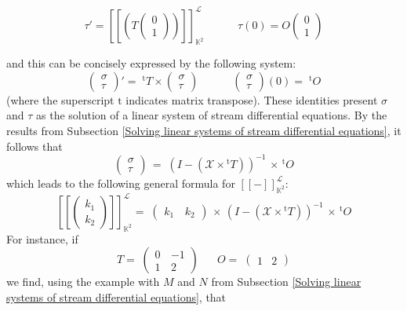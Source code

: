 \documentclass[3p]{elsarticle}
\newcommand{\X}{\mathcal{X}}           %
\newcommand{\fL}{\mathcal{L}}    %
\newcommand{\streamproduct}{\times} %
\newcommand{\beh}[3]{\left[\!\left[ #1 \right]\!\right]^{#2}_{#3}} %
\newcommand{\transp}{{}^{\mathrm{t}}}  %
\newcommand{\K}{\mathbb{K}}            %
\begin{document}
\[
\tau'=\beh{(T
%
\left(%
\begin{array}{c}
  0 \\
  1
\end{array}\right))}{\fL}{\K^2}
%
\;\;\;\;\;\;\;\;\;\;\; \tau(0)=O \left(%
\begin{array}{c}
  0 \\
  1
\end{array}\right)
\]

and this can be concisely expressed by the following system:
\[
\begin{pmatrix}
\sigma \\ \tau
\end{pmatrix} '
= \; \transp{T} \streamproduct
\begin{pmatrix}
\sigma \\ \tau
\end{pmatrix}
\;\;\;\;\;\;\;\;\;\;\;
\begin{pmatrix}
\sigma \\ \tau
\end{pmatrix} (0)
= \; \transp{O}
\]
(where the superscript $\mathrm{t}$ indicates matrix transpose). These
identities present $\sigma$ and $\tau$ as the solution of a linear
system of stream differential equations. By the results from
Subsection \ref{Solving linear systems of stream differential
equations}, it follows that
\[
\begin{pmatrix}%
\sigma \\ \tau
\end{pmatrix}
\, = \; (I - (\X \streamproduct \transp{T}))^{-1} \, \streamproduct
\, \transp{O}
\]
which leads to the following general formula for $\beh{-}{\fL}{\K^2}$:
\[
\beh{\begin{pmatrix} k_1 \\ k_2
\end{pmatrix}}{\fL}{\K^2} = \;
\begin{pmatrix}
k_1 \,  & k_2
\end{pmatrix}
\, \streamproduct \, (I - (\X \streamproduct \transp{T}))^{-1} \,
\streamproduct \, \transp{O}
\]
For instance, if
\[
T = \;
\begin{pmatrix}
0 \, & -1 \\ 1 \,  & 2
\end{pmatrix}
\;\;\;\;\;\; O = \;
\begin{pmatrix}
1  &  2
\end{pmatrix}
\]
we find, using the example with $M$ and $N$ from Subsection \ref{Solving linear
systems of stream differential equations}, that
\end{document}
